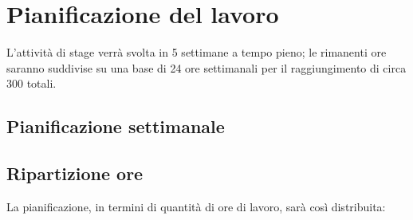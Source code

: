 
\section*{Pianificazione del lavoro}

L'attività di stage verrà svolta in 5 settimane a tempo pieno; le rimanenti ore saranno suddivise su una base di 24 ore settimanali per il raggiungimento di circa 300 totali.

\subsection*{Pianificazione settimanale}
\prospettoSettimanale

\newpage

\subsection*{Ripartizione ore}

La pianificazione, in termini di quantità di ore di lavoro, sarà così distribuita:

\begin{center}
    
\end{center}

\newpage